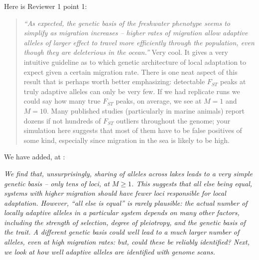 Here is Reviewer 1 point 1:
\begin{quote}
    \textit{``As expected, the genetic basis of the freshwater phenotype seems to simplify
    as migration increases -- higher rates of migration allow adaptive alleles of
    larger effect to travel more efficiently through the population, even though
    they are deleterious in the ocean.''}
    Very cool. It gives a very intuitive guideline as to which genetic
    architecture of local adaptation to expect given a certain migration rate.
    There is one neat aspect of this result that is perhaps worth better
    emphasizing: detectable $F_{ST}$ peaks at truly adaptive
    alleles can only be very few. If we had replicate runs we could say how many
    true $F_{ST}$ peaks, on average, we see at $M=1$ and $M=10$. Many published studies
    (particularly in marine animals) report dozens if not hundreds of $F_{ST}$ outliers
    throughout the genome; your simulation here suggests that most of them have to
    be false positives of some kind, especially since migration in the sea is
    likely to be high.
\end{quote}


We have added, at :

\textit{
We find that, unsurprisingly, sharing of alleles across lakes leads to
a very simple genetic basis -- only tens of loci, at $M \ge 1$.
This suggests that all else being equal, systems with higher migration
should have fewer loci responsible for local adaptation.
However, ``all else is equal'' is rarely plausible:
the actual number of locally adaptive alleles in a particular system
depends on many other factors, including
the strength of selection, degree of pleiotropy, and the genetic basis of the trait.
A different genetic basis could well lead to a much larger number of alleles, even at high migration rates:
but, could these be reliably identified?
Next, we look at how well adaptive alleles are identified with genome scans.
}



